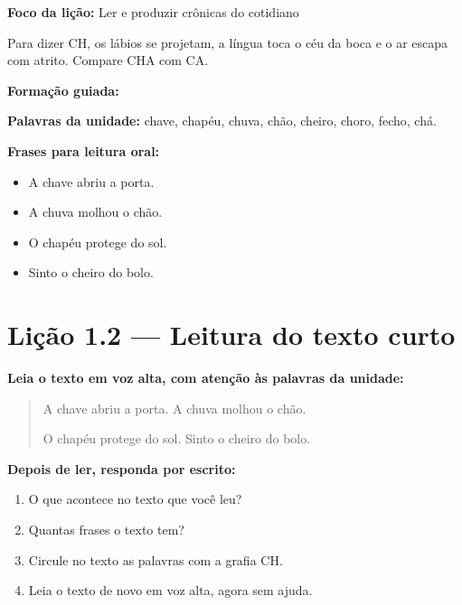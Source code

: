 \textbf{Foco da lição:} Ler e produzir crônicas do cotidiano


\begin{boquinha}
Para dizer CH, os lábios se projetam, a língua toca o céu da boca e o ar escapa com atrito. Compare CHA com CA.
\end{boquinha}

\noindent\textbf{Formação guiada:}

\begin{center}
\end{center}

\noindent\textbf{Palavras da unidade:} chave, chapéu, chuva, chão, cheiro, choro, fecho, chá.

\noindent\textbf{Frases para leitura oral:}
\begin{itemize}[leftmargin=1.6em]
  \item A chave abriu a porta.
  \item A chuva molhou o chão.
  \item O chapéu protege do sol.
  \item Sinto o cheiro do bolo.
\end{itemize}

\section{Lição 1.2 --- Leitura do texto curto}

\noindent\textbf{Leia o texto em voz alta, com atenção às palavras da unidade:}


\begin{quote}
A chave abriu a porta. A chuva molhou o chão.

O chapéu protege do sol. Sinto o cheiro do bolo.
\end{quote}

\textbf{Depois de ler, responda por escrito:}
\begin{enumerate}

  \item O que acontece no texto que você leu?
  \begin{center}
  \underline{\hspace{12cm}}
  \end{center}

  \item Quantas frases o texto tem?
  \begin{center}
  \underline{\hspace{12cm}}
  \end{center}

  \item Circule no texto as palavras com a grafia CH.

  \item Leia o texto de novo em voz alta, agora sem ajuda.

\end{enumerate}

